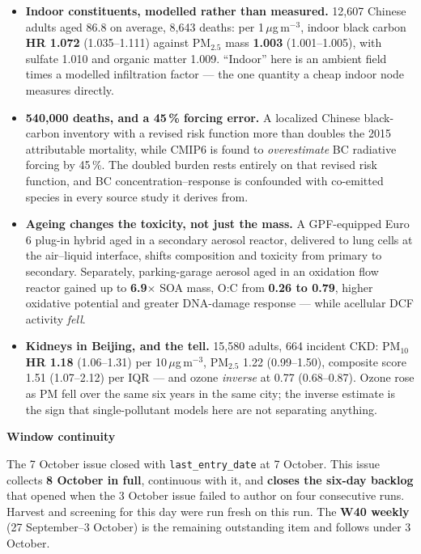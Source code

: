 \documentclass[10pt]{article}
\begin{document}
\footnotesize
\begin{itemize}

\item \textbf{Indoor constituents, modelled rather than measured.} 12,607 Chinese adults aged 86.8 on
average, 8,643 deaths: per 1\,$\mu$g\,m$^{-3}$, indoor black carbon \textbf{HR 1.072} (1.035--1.111)
against PM$_{2.5}$ mass \textbf{1.003} (1.001--1.005), with sulfate 1.010 and organic matter 1.009.
``Indoor'' here is an ambient field times a modelled infiltration factor --- the one quantity a cheap
indoor node measures directly.

\item \textbf{540,000 deaths, and a 45\,\% forcing error.} A localized Chinese black-carbon inventory with a
revised risk function more than doubles the 2015 attributable mortality, while CMIP6 is found to
\textit{overestimate} BC radiative forcing by 45\,\%. The doubled burden rests entirely on that revised
risk function, and BC concentration--response is confounded with co-emitted species in every source study
it derives from.

\item \textbf{Ageing changes the toxicity, not just the mass.} A GPF-equipped Euro 6 plug-in hybrid aged in a
secondary aerosol reactor, delivered to lung cells at the air--liquid interface, shifts composition and
toxicity from primary to secondary. Separately, parking-garage aerosol aged in an oxidation flow reactor
gained up to \textbf{6.9$\times$} SOA mass, O:C from \textbf{0.26 to 0.79}, higher oxidative potential and
greater DNA-damage response --- while acellular DCF activity \textit{fell}.

\item \textbf{Kidneys in Beijing, and the tell.} 15,580 adults, 664 incident CKD: PM$_{10}$ \textbf{HR 1.18}
(1.06--1.31) per 10\,$\mu$g\,m$^{-3}$, PM$_{2.5}$ 1.22 (0.99--1.50), composite score 1.51 (1.07--2.12) per
IQR --- and ozone \textit{inverse} at 0.77 (0.68--0.87). Ozone rose as PM fell over the same six years in
the same city; the inverse estimate is the sign that single-pollutant models here are not separating
anything.

\end{itemize}

\vspace{2mm}

\begin{keybox}
{\sffamily\bfseries\footnotesize\color{Deep}Window continuity}\\[1.2mm]
{\fontsize{7.2}{8.8}\selectfont
The 7 October issue closed with \texttt{last\_entry\_date} at 7 October. This issue collects
\textbf{8 October in full}, continuous with it, and \textbf{closes the six-day backlog} that opened when
the 3 October issue failed to author on four consecutive runs. Harvest and screening for this day were run
fresh on this run. The \textbf{W40 weekly} (27 September--3 October) is the remaining outstanding item and
follows under 3 October.\par}
\end{keybox}
\end{document}
